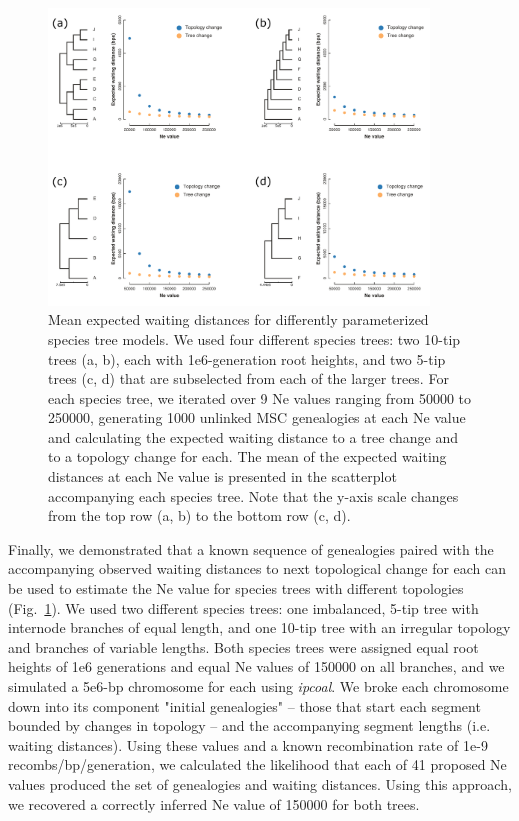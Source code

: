 \documentclass[11pt]{article}
\begin{document}
\begin{figure}
	\centering
	\includegraphics[width=0.9\textwidth]{figures/Fig5-waiting_times_ne_means.pdf}
	\caption{Mean expected waiting distances for differently parameterized species tree models. We used four different species trees: two 10-tip trees (a, b), each with 1e6-generation root heights, and two 5-tip trees (c, d) that are subselected from each of the larger trees. For each species tree, we iterated over 9 Ne values ranging from 50000 to 250000, generating 1000 unlinked MSC genealogies at each Ne value and calculating the expected waiting distance to a tree change and to a topology change for each. The mean of the expected waiting distances at each Ne value is presented in the scatterplot accompanying each species tree. Note that the y-axis scale changes from the top row (a, b) to the bottom row (c, d).}
	 \label{fig:fig4}
\end{figure}


Finally, we demonstrated that a known sequence of genealogies paired with the accompanying
observed waiting distances to next topological change for each can be used to estimate the 
Ne value for species trees with different topologies (Fig.~\ref{fig:fig4}). We used two 
different species trees: one imbalanced, 5-tip tree with internode branches of equal length,
and one 10-tip tree with an irregular topology and branches of variable lengths. Both species 
trees were assigned equal root heights of 1e6 generations and equal Ne values of 150000 on all 
branches, and we simulated a 5e6-bp chromosome for each using \emph{ipcoal}. We broke each 
chromosome down into its component "initial genealogies" -- those that start each segment 
bounded by changes in topology -- and the accompanying segment lengths (i.e. waiting 
distances). Using these values and a known recombination rate of 1e-9 recombs/bp/generation, 
we calculated the likelihood that each of 41 proposed Ne values produced the set of 
genealogies and waiting distances. Using this approach, we recovered a correctly inferred Ne 
value of 150000 for both trees.
\end{document}
